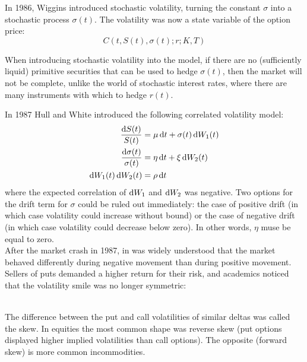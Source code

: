 \documentclass[11pt]{article}
\begin{document}
In 1986, Wiggins introduced stochastic volatility, turning the constant $\sigma$ into a stochastic process $\sigma(t)$. The volatility was now a state variable of the option price:
$$C(t, S(t), \sigma(t); r; K, T)$$

\begin{remark}
When introducing stochastic volatility into the model, if there are no (sufficiently liquid) primitive securities that can be used to hedge $\sigma(t)$, then the market will not be complete, unlike the world of stochastic interest rates, where there are many instruments with which to hedge $r(t)$.
\end{remark}

In 1987 Hull and White introduced the following correlated volatility model:
\begin{align*}
\frac{\dif S(t)}{S(t)} &= \mu \dif t + \sigma(t) \dif W_1(t) \\
\frac{\dif \sigma(t)}{\sigma(t)} &= \eta \dif t + \xi \dif W_2(t) \\
\dif W_1(t) \dif W_2(t) &= \rho \dif t
\end{align*}
where the expected correlation of $\dif W_1$ and $\dif W_2$ was negative. Two options for the drift term for $\sigma$ could be ruled out immediately: the case of positive drift (in which case volatility could increase without bound) or the case of negative drift (in which case volatility could decrease below zero). In other words, $\eta$ muse be equal to zero. \\

After the market crash in 1987, in was widely understood that the market behaved differently during negative movement than during positive movement. Sellers of puts demanded a higher return for their risk, and academics noticed that the volatility smile was no longer symmetric: \\

 \\

The difference between the put and call volatilities of similar deltas was called the skew. In equities the most common shape was reverse skew (put options displayed higher implied volatilities than call options). The opposite (forward skew) is more common incommodities. \\
\end{document}
